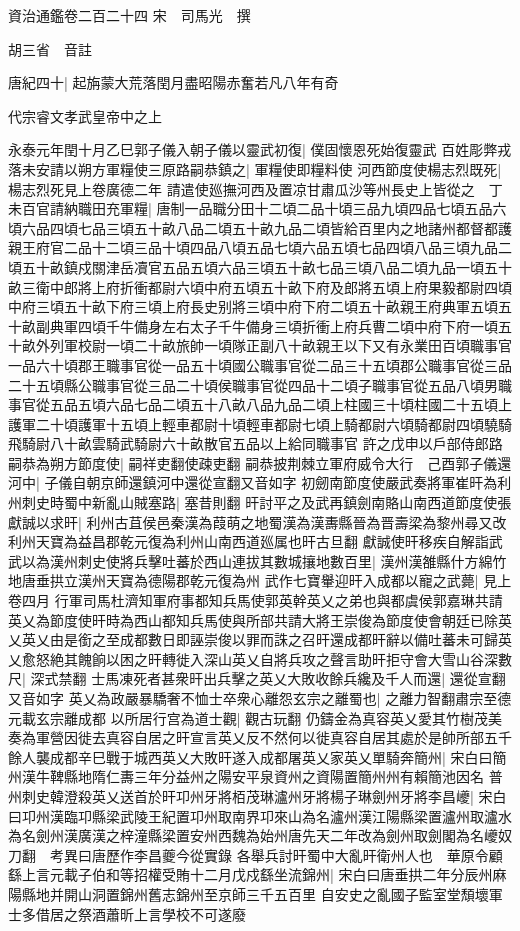 資治通鑑卷二百二十四
宋　司馬光　撰

胡三省　音註

唐紀四十|{
	起旃蒙大荒落閏月盡昭陽赤奮若凡八年有奇}


代宗睿文孝武皇帝中之上

永泰元年閏十月乙巳郭子儀入朝子儀以靈武初復|{
	僕固懷恩死始復靈武}
百姓彫弊戎落未安請以朔方軍糧使三原路嗣恭鎮之|{
	軍糧使即糧料使}
河西節度使楊志烈既死|{
	楊志烈死見上卷廣德二年}
請遣使廵撫河西及置凉甘肅瓜沙等州長史上皆從之　丁未百官請納職田充軍糧|{
	唐制一品職分田十二頃二品十頃三品九頃四品七頃五品六頃六品四頃七品三頃五十畝八品二頃五十畝九品二頃皆給百里内之地諸州都督都護親王府官二品十二頃三品十頃四品八頃五品七頃六品五頃七品四頃八品三頃九品二頃五十畝鎮戍關津岳凟官五品五頃六品三頃五十畝七品三頃八品二頃九品一頃五十畝三衛中郎將上府折衝都尉六頃中府五頃五十畝下府及郎將五頃上府果毅都尉四頃中府三頃五十畝下府三頃上府長史别將三頃中府下府二頃五十畝親王府典軍五頃五十畝副典軍四頃千牛備身左右太子千牛備身三頃折衝上府兵曹二頃中府下府一頃五十畝外列軍校尉一頃二十畝旅帥一頃隊正副八十畝親王以下又有永業田百頃職事官一品六十頃郡王職事官從一品五十頃國公職事官從二品三十五頃郡公職事官從三品二十五頃縣公職事官從三品二十頃侯職事官從四品十二頃子職事官從五品八頃男職事官從五品五頃六品七品二頃五十八畝八品九品二頃上柱國三十頃柱國二十五頃上護軍二十頃護軍十五頃上輕車都尉十頃輕車都尉七頃上騎都尉六頃騎都尉四頃驍騎飛騎尉八十畝雲騎武騎尉六十畝散官五品以上給同職事官}
許之戊申以戶部侍郎路嗣恭為朔方節度使|{
	嗣祥吏翻使疎吏翻}
嗣恭披荆棘立軍府威令大行　己酉郭子儀還河中|{
	子儀自朝京師還鎮河中還從宣翻又音如字}
初劒南節度使嚴武奏將軍崔旰為利州刺史時蜀中新亂山賊塞路|{
	塞昔則翻}
旰討平之及武再鎮劍南賂山南西道節度使張獻誠以求旰|{
	利州古苴侯邑秦漢為葭萌之地蜀漢為漢夀縣晉為晋壽梁為黎州尋又改利州天寶為益昌郡乾元復為利州山南西道廵属也旰古旦翻}
獻誠使旰移疾自解詣武武以為漢州刺史使將兵擊吐蕃於西山連拔其數城攘地數百里|{
	漢州漢雒縣什方綿竹地唐垂拱立漢州天寶為德陽郡乾元復為州}
武作七寶轝迎旰入成都以寵之武薨|{
	見上卷四月}
行軍司馬杜濟知軍府事都知兵馬使郭英幹英乂之弟也與都虞侯郭嘉琳共請英乂為節度使旰時為西山都知兵馬使與所部共請大將王崇俊為節度使會朝廷已除英乂英乂由是銜之至成都數日即誣崇俊以罪而誅之召旰還成都旰辭以備吐蕃未可歸英乂愈怒絶其餽餉以困之旰轉徙入深山英乂自將兵攻之聲言助旰拒守會大雪山谷深數尺|{
	深式禁翻}
士馬凍死者甚衆旰出兵擊之英乂大敗收餘兵纔及千人而還|{
	還從宣翻又音如字}
英乂為政嚴暴驕奢不恤士卒衆心離怨玄宗之離蜀也|{
	之離力智翻肅宗至德元載玄宗離成都}
以所居行宫為道士觀|{
	觀古玩翻}
仍鑄金為真容英乂愛其竹樹茂美奏為軍營因徙去真容自居之旰宣言英乂反不然何以徙真容自居其處於是帥所部五千餘人襲成都辛巳戰于城西英乂大敗旰遂入成都屠英乂家英乂單騎奔簡州|{
	宋白曰簡州漢牛鞞縣地隋仁夀三年分益州之陽安平泉資州之資陽置簡州州有賴簡池因名}
普州刺史韓澄殺英乂送首於旰卭州牙將栢茂琳瀘州牙將楊子琳劍州牙將李昌巙|{
	宋白曰卭州漢臨卭縣梁武陵王紀置卭州取南界卭來山為名瀘州漢江陽縣梁置瀘州取瀘水為名劍州漢廣漢之梓潼縣梁置安州西魏為始州唐先天二年改為劍州取劍閣為名巙奴刀翻　考異曰唐歷作李昌夔今從實錄}
各舉兵討旰蜀中大亂旰衛州人也　華原令顧繇上言元載子伯和等招權受賄十二月戊戍繇坐流錦州|{
	宋白曰唐垂拱二年分辰州麻陽縣地并開山洞置錦州舊志錦州至京師三千五百里}
自安史之亂國子監室堂頹壞軍士多借居之祭酒蕭昕上言學校不可遂廢

